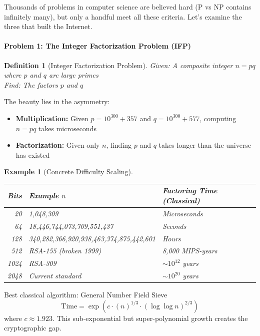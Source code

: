 \documentclass[11pt,a4paper]{article}
\newtheorem{definition}{Definition}
\newtheorem{example}{Example}
\begin{document}
Thousands of problems in computer science are believed hard (P vs NP contains infinitely many), but only a handful meet all these criteria. Let's examine the three that built the Internet.

\paragraph{Problem 1: The Integer Factorization Problem (IFP)}

\begin{definition}[Integer Factorization Problem]
Given: A composite integer $n = pq$ where $p$ and $q$ are large primes\\
Find: The factors $p$ and $q$
\end{definition}

The beauty lies in the asymmetry:
\begin{itemize}
    \item \textbf{Multiplication:} Given $p = 10^{300} + 357$ and $q = 10^{300} + 577$, computing $n = pq$ takes microseconds
    \item \textbf{Factorization:} Given only $n$, finding $p$ and $q$ takes longer than the universe has existed
\end{itemize}

\begin{example}[Concrete Difficulty Scaling]
\begin{center}
\begin{tabular}{|r|l|l|}
\hline
\textbf{Bits} & \textbf{Example $n$} & \textbf{Factoring Time (Classical)} \\
\hline
20 & 1,048,309 & Microseconds \\
64 & 18,446,744,073,709,551,437 & Seconds \\
128 & 340,282,366,920,938,463,374,875,442,601 & Hours \\
512 & RSA-155 (broken 1999) & 8,000 MIPS-years \\
1024 & RSA-309 & $\sim 10^{12}$ years \\
2048 & Current standard & $\sim 10^{20}$ years \\
\hline
\end{tabular}
\end{center}
\end{example}

Best classical algorithm: General Number Field Sieve
\begin{equation}
\text{Time} = \exp\left(c \cdot (n)^{1/3} \cdot (\log \log n)^{2/3}\right)
\end{equation}
where $c \approx 1.923$. This sub-exponential but super-polynomial growth creates the cryptographic gap.
\end{document}
